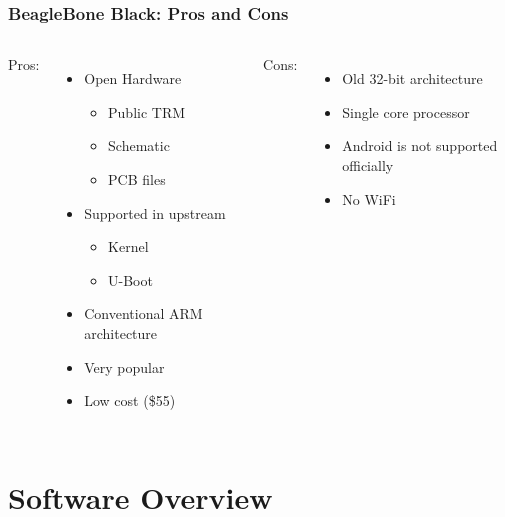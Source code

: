 \documentclass[aspectratio=169]{beamer}
\begin{document}
\begin{frame}
  \frametitle{BeagleBone Black: Pros and Cons}
  \begin{columns}[t]
    Pros:
    \begin{itemize}
    \item Open Hardware
      \begin{itemize}
      \item Public TRM
      \item Schematic
      \item PCB files
      \end{itemize}
    \item Supported in upstream
      \begin{itemize}
      \item Kernel
      \item U-Boot
      \end{itemize}
    \item Conventional ARM architecture
    \item Very popular
    \item Low cost (\$55)
    \end{itemize}

    Cons:
    \begin{itemize}
    \item Old 32-bit architecture
    \item Single core processor
    \item Android is not supported officially
    \item No WiFi
    \end{itemize}
  \end{columns}
\end{frame}

\section{Software Overview}
\end{document}
